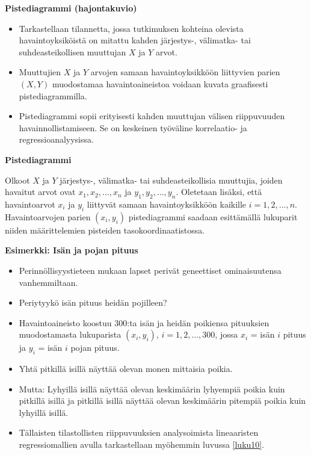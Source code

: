 \documentclass[
]{book}
\providecommand{\tightlist}{%
  \setlength{\itemsep}{0pt}\setlength{\parskip}{0pt}}
\begin{document}
\hfill\break

\textbf{Pistediagrammi (hajontakuvio)}

\begin{itemize}
\item
  Tarkastellaan tilannetta, jossa tutkimuksen kohteina olevista havaintoyksiköistä on mitattu kahden järjestys-, välimatka- tai suhdeasteikollisen muuttujan \(X\) ja \(Y\) arvot.
\item
  Muuttujien \(X\) ja \(Y\) arvojen samaan havaintoyksikköön liittyvien parien \((X,Y)\) muodostamaa havaintoaineistoa voidaan kuvata graafisesti pistediagrammilla.
\item
  Pistediagrammi sopii erityisesti kahden muuttujan välisen riippuvuuden havainnollistamiseen. Se on keskeinen työväline korrelaatio- ja regressioanalyysissa.
\end{itemize}

\begin{defblock}{}
\textbf{Pistediagrammi}

Olkoot \(X\) ja \(Y\) järjestys-, välimatka- tai suhdeasteikollisia muuttujia, joiden havaitut arvot ovat \(x_1, x_2, \ldots, x_n\) ja \(y_1, y_2, \ldots, y_n\). Oletetaan lisäksi, että havaintoarvot \(x_i\) ja \(y_i\) liittyvät samaan havaintoyksikköön kaikille \(i = 1, 2, \ldots, n\). Havaintoarvojen parien \((x_i, y_i)\) pistediagrammi saadaan esittämällä lukuparit niiden määrittelemien pisteiden tasokoordinaatistossa.

\end{defblock}

\begin{eblock}{}

\textbf{Esimerkki: Isän ja pojan pituus}

\begin{itemize}
\tightlist
\item
  Perinnöllisyystieteen mukaan lapset perivät geneettiset ominaisuutensa vanhemmiltaan.
\item
  Periytyykö isän pituus heidän pojilleen?
\item
  Havaintoaineisto koostuu 300:ta isän ja heidän poikiensa pituuksien muodostamasta lukuparista \((x_i , y_i),\, i = 1, 2, \ldots, 300\), jossa \(x_i\) = isän \(i\) pituus ja \(y_i\) = isän \(i\) pojan pituus.
\item
  Yhtä pitkillä isillä näyttää olevan monen mittaisia poikia.
\item
  Mutta: Lyhyillä isillä näyttää olevan keskimäärin lyhyempiä poikia kuin pitkillä isillä ja pitkillä isillä näyttää olevan keskimäärin pitempiä poikia kuin lyhyillä isillä.
\item
  Tällaisten tilastollisten riippuvuuksien analysoimista lineaaristen regressiomallien avulla tarkastellaan myöhemmin luvussa \ref{luku10}.
\end{itemize}

\end{eblock}
\end{document}
